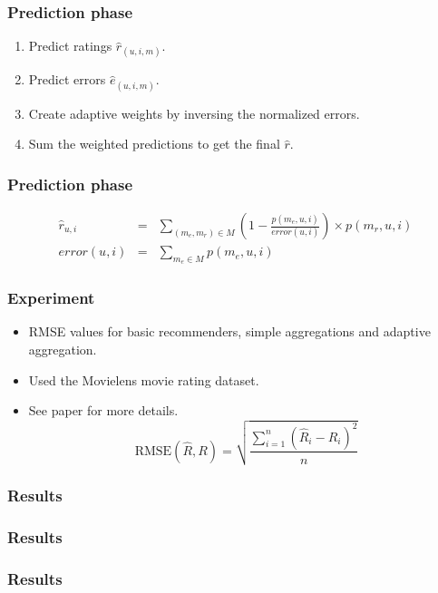 \documentclass[screen]{beamer}
\begin{document}
\begin{frame}
  \frametitle{Prediction phase}
  
  \begin{enumerate}
    \item Predict ratings $\hat{r}_{(u,i,m)}$.
    \item Predict errors $\hat{e}_{(u,i,m)}$.
    \item Create adaptive weights by inversing the normalized errors.
    \item Sum the weighted predictions to get the final $\hat{r}$.
  \end{enumerate}  
\end{frame}

\begin{frame}
  \frametitle{Prediction phase}
  \begin{eqnarray}
    \label{eq:adaptive}
    \hat{r}_{u,i} &=& \sum_{(m_{e}, m_{r}) \in M} (1 - 
    \frac{
      p(m_{e},u,i)
    }{
      error(u,i)
    }) \times p(m_{r},u,i)\\[2em]
    error(u,i) &=& \sum_{m_e \in M} p(m_e,u,i)     
  \end{eqnarray}
\end{frame}

\begin{frame}
  \frametitle{Experiment}
  \begin{itemize}
    \item RMSE values for basic recommenders, simple aggregations and adaptive aggregation.
    \item Used the Movielens movie rating dataset.
    \item See paper for more details.
    \vspace{2em}
    \begin{equation}
      \mathrm{RMSE}(\hat{R},R)
      = \sqrt{\frac{
          \sum_{i=1}^{n} (\hat{R}_i - R_i)^2
        }{
          n
        }}
    \end{equation}
  \end{itemize}
\end{frame}

\begin{frame}
  \frametitle{Results}
  
\end{frame}

\begin{frame}
  \frametitle{Results}
  
\end{frame}

\begin{frame}
  \frametitle{Results}
  
\end{frame}
\end{document}
